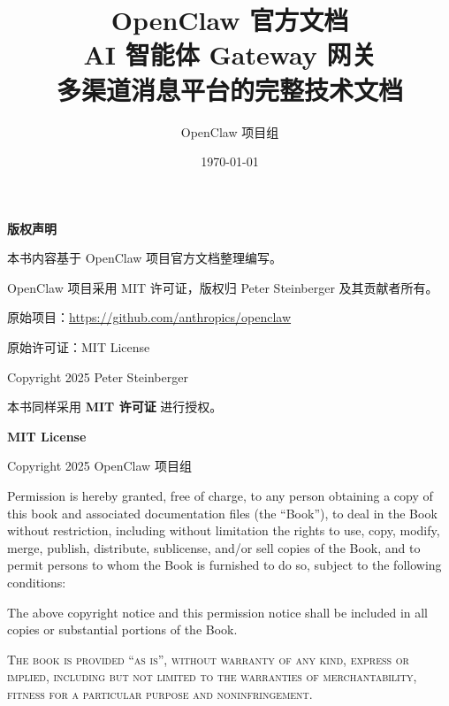 \documentclass[a4paper,12pt,openany]{book}
\title{
    \vspace{2cm}
{\Huge\textbf{OpenClaw 官方文档}} \\
    \vspace{0.5cm}
    {\Large AI 智能体 Gateway 网关} \\
    \vspace{0.5cm}
    {\large 多渠道消息平台的完整技术文档}
    \vspace{2cm}
}
\author{OpenClaw 项目组}
\date{\today}
\begin{document}
\maketitle
\thispagestyle{empty}

\clearpage
\thispagestyle{empty}
\vspace*{\fill}
\begin{center}
{\large\textbf{版权声明}}
\end{center}

\bigskip

\noindent 本书内容基于 OpenClaw 项目官方文档整理编写。

\medskip

\noindent OpenClaw 项目采用 MIT 许可证，版权归 Peter Steinberger 及其贡献者所有。

\medskip

\noindent 原始项目：\url{https://github.com/anthropics/openclaw}

\noindent 原始许可证：MIT License

\noindent Copyright \textcopyright{} 2025 Peter Steinberger

\bigskip

\noindent 本书同样采用 \textbf{MIT 许可证} 进行授权。

\bigskip

\noindent \textbf{MIT License}

\medskip

\noindent Copyright \textcopyright{} 2025 OpenClaw 项目组

\medskip

\noindent Permission is hereby granted, free of charge, to any person obtaining a copy
of this book and associated documentation files (the ``Book''), to deal
in the Book without restriction, including without limitation the rights
to use, copy, modify, merge, publish, distribute, sublicense, and/or sell
copies of the Book, and to permit persons to whom the Book is furnished to
do so, subject to the following conditions:

\medskip

\noindent The above copyright notice and this permission notice shall be included in all
copies or substantial portions of the Book.

\medskip

\noindent \textsc{The book is provided ``as is'', without warranty of any kind, express or
implied, including but not limited to the warranties of merchantability,
fitness for a particular purpose and noninfringement.}
\end{document}
